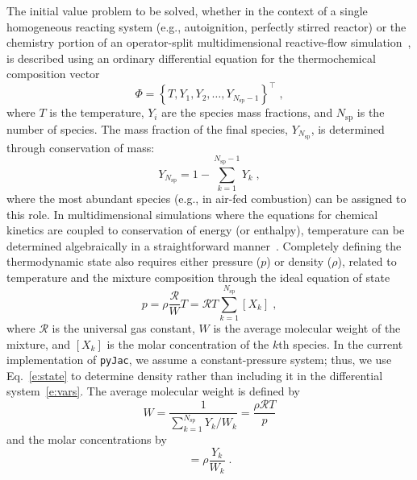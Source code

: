 \documentclass[preprint,12pt]{elsarticle}
\newcommand{ \numsp }{N_{\text{sp}}}
\begin{document}
The initial value problem to be solved, whether in the context of a single homogeneous reacting system (e.g., autoignition, perfectly stirred reactor) or the chemistry portion of an operator-split multidimensional reactive-flow simulation~\cite{Oran:2001aa}, is described using an ordinary differential equation for the thermochemical composition vector
\begin{equation}
\label{e:vars}
\Phi = \left \lbrace T, Y_1, Y_2, \dotsc, Y_{\numsp - 1} \right \rbrace^{\intercal} \;,
\end{equation}
where $T$ is the temperature, $Y_i$ are the species mass fractions, and $\numsp$ is the number of species.
The mass fraction of the final species, $Y_{\numsp}$, is determined through conservation of mass:
\begin{equation}
Y_{\numsp} = 1 - \sum_{k=1}^{\numsp - 1} Y_k \;,
\label{e:y_nsp}
\end{equation}
where the most abundant species (e.g.,  in air-fed combustion) can be assigned to this role.
In multidimensional simulations where the equations for chemical kinetics are coupled to conservation of energy (or enthalpy), temperature can be determined algebraically in a straightforward manner~\cite{Oran:2001aa}.
Completely defining the thermodynamic state also requires either pressure ($p$) or density ($\rho$), related to temperature and the mixture composition through the ideal equation of state
\begin{equation}
\label{e:state}
p = \rho \frac{\mathcal{R}}{W} T = \mathcal{R} T \sum_{k=1}^{\numsp} [X_k] \;,
\end{equation}
where $\mathcal{R}$ is the universal gas constant, $W$ is the average molecular weight of the mixture, and $[X_k]$ is the molar concentration of the $k$th species.
In the current implementation of \texttt{pyJac}, we assume a constant-pressure system; thus, we use Eq.~\eqref{e:state} to determine density rather than including it in the differential system~\eqref{e:vars}.
The average molecular weight is defined by
\begin{equation}
W = \frac{1}{\sum_{k=1}^{\numsp} Y_k / W_k} = \frac{\rho \mathcal{R} T}{p}
\end{equation}
and the molar concentrations by
\begin{equation}
[X_k] = \rho \frac{Y_k}{W_k} \;.
\end{equation}
\end{document}
